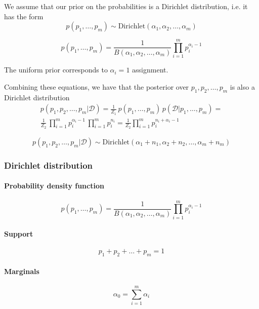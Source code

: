 \documentclass{article}
\begin{document}
We assume that our prior on the probabilities is a Dirichlet distribution, i.e. it has the form 
\begin{equation*}
p(p_1, \ldots, p_m) \sim \textrm{Dirichlet}(\alpha_1, \alpha_2, \ldots, \alpha_m)
\end{equation*}

\begin{equation}
p(p_1, \ldots, p_m) = \frac{1}{B(\alpha_1, \alpha_2, \ldots, \alpha_m)} \prod_{i=1}^m{p_i^{\alpha_i - 1}}
\end{equation}

The uniform prior corresponds to $\alpha_i = 1$ assignment.

Combining these equations, we have that the posterior over $p_1, p_2, \ldots, p_m$ is also a Dirichlet distribution
\begin{multline}
p(p_1, p_2, \ldots, p_m|\mathcal{D}) = \frac{1}{Z_1}\,p(p_1, \ldots, p_m)\,p(\mathcal{D}|p_1, \ldots, p_m) = \\ \frac{1}{Z_2} \, \prod_{i=1}^m{p_i^{\alpha_i - 1}} \, \prod_{i=1}^m{p_i^{n_i}} = \frac{1}{Z_2}{ \prod_{i=1}^m{p_i^{n_i + \alpha_i - 1}}}
\end{multline}

\begin{equation*}
p(p_1, p_2, \ldots, p_m|\mathcal{D}) \sim \textrm{Dirichlet}(\alpha_1 + n_1, \alpha_2 + n_2, \ldots, \alpha_m + n_m)
\end{equation*}

\subsubsection{Dirichlet distribution}

\paragraph{Probability density function}
\begin{equation}
p(p_1, \ldots, p_m) = \frac{1}{B(\alpha_1, \alpha_2, \ldots, \alpha_m)} \prod_{i=1}^m{p_i^{\alpha_i - 1}}
\end{equation}

\paragraph{Support}
\begin{equation}
p_1 + p_2 + \ldots + p_m = 1
\end{equation}

\paragraph{Marginals}
\begin{equation*}
\alpha_0 = \sum_{i=1}^m{\alpha_i}
\end{equation*}
\end{document}

